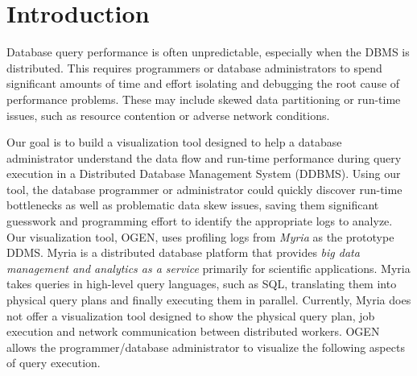\documentclass{chi2009}
\newcommand*{\system}{OGEN\xspace}
\begin{document}
\section{Introduction}

Database query performance is often unpredictable, especially when the DBMS is
distributed. This requires programmers or database administrators to spend
significant amounts of time and effort isolating and debugging the root cause
of performance problems. These may include skewed data partitioning or run-time
issues, such as resource contention or adverse network conditions.

Our goal is to build a visualization tool designed to help a database administrator understand the data flow and run-time
performance during query execution in a Distributed Database Management System (DDBMS). Using our tool, the
database programmer or administrator could quickly discover run-time bottlenecks as well as problematic data skew issues,
saving them significant guesswork and programming effort to identify the appropriate logs to analyze. Our visualization tool,
\system, uses profiling logs from \emph{Myria} \cite{myria} as the prototype DDMS. Myria is a distributed
database platform that provides \emph{big data management and analytics as a service} primarily for scientific applications.
Myria takes queries in high-level query languages, such as SQL, translating them into physical query plans and finally executing
them in parallel. Currently, Myria does not offer a visualization tool designed to show the physical query plan, job execution and network
communication between distributed workers. \system allows the programmer/database administrator to visualize the following aspects
of query execution.
\end{document}
